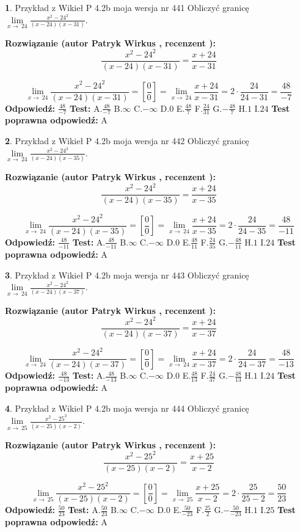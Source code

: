 \documentclass[12pt, a4paper]{article}
\theoremstyle{definition} %
\newtheorem{zad}{}
\newcommand{\zadStart}[1]{\begin{zad}#1\newline}
\newcommand{\zadStop}{\end{zad}}
\newcommand{\rozwStart}[2]{\noindent \textbf{Rozwiązanie (autor #1 , recenzent #2): }\newline}
\newcommand{\rozwStop}{\newline}
\newcommand{\odpStart}{\noindent \textbf{Odpowiedź:}\newline}
\newcommand{\odpStop}{\newline}
\newcommand{\testStart}{\noindent \textbf{Test:}\newline}
\newcommand{\testStop}{\newline}
\newcommand{\kluczStart}{\noindent \textbf{Test poprawna odpowiedź:}\newline}
\newcommand{\kluczStop}{\newline}
\begin{document}
\zadStart{Przykład z Wikieł P 4.2b moja wersja nr 441}
Obliczyć granicę $\lim\limits_{x\to\ 24}\frac{x^{2}-24^{2}}{(x-24)(x-31)}$.
\zadStop
\rozwStart{Patryk Wirkus}{}
$$\frac{x^{2}-24^{2}}{(x-24)(x-31)}=\frac{x+24}{x-31}$$

$$\lim\limits_{x\to\ 24}\frac{x^{2}-24^{2}}{(x-24)(x-31)}=[\frac{0}{0}]=\lim\limits_{x\to\ 24}\frac{x+24}{x-31}=2 \cdot \frac{24}{24-31} = \frac{48}{-7}$$
\rozwStop
\odpStart
$\frac{48}{-7}$
\odpStop
\testStart
A.$\frac{48}{-7}$
B.$\infty$
C.$-\infty$
D.$0$
E.$\frac{48}{7}$
F.$\frac{24}{31}$
G.$-\frac{48}{7}$
H.$1$
I.$24$
\testStop
\kluczStart
A
\kluczStop



\zadStart{Przykład z Wikieł P 4.2b moja wersja nr 442}
Obliczyć granicę $\lim\limits_{x\to\ 24}\frac{x^{2}-24^{2}}{(x-24)(x-35)}$.
\zadStop
\rozwStart{Patryk Wirkus}{}
$$\frac{x^{2}-24^{2}}{(x-24)(x-35)}=\frac{x+24}{x-35}$$

$$\lim\limits_{x\to\ 24}\frac{x^{2}-24^{2}}{(x-24)(x-35)}=[\frac{0}{0}]=\lim\limits_{x\to\ 24}\frac{x+24}{x-35}=2 \cdot \frac{24}{24-35} = \frac{48}{-11}$$
\rozwStop
\odpStart
$\frac{48}{-11}$
\odpStop
\testStart
A.$\frac{48}{-11}$
B.$\infty$
C.$-\infty$
D.$0$
E.$\frac{48}{11}$
F.$\frac{24}{35}$
G.$-\frac{48}{11}$
H.$1$
I.$24$
\testStop
\kluczStart
A
\kluczStop



\zadStart{Przykład z Wikieł P 4.2b moja wersja nr 443}
Obliczyć granicę $\lim\limits_{x\to\ 24}\frac{x^{2}-24^{2}}{(x-24)(x-37)}$.
\zadStop
\rozwStart{Patryk Wirkus}{}
$$\frac{x^{2}-24^{2}}{(x-24)(x-37)}=\frac{x+24}{x-37}$$

$$\lim\limits_{x\to\ 24}\frac{x^{2}-24^{2}}{(x-24)(x-37)}=[\frac{0}{0}]=\lim\limits_{x\to\ 24}\frac{x+24}{x-37}=2 \cdot \frac{24}{24-37} = \frac{48}{-13}$$
\rozwStop
\odpStart
$\frac{48}{-13}$
\odpStop
\testStart
A.$\frac{48}{-13}$
B.$\infty$
C.$-\infty$
D.$0$
E.$\frac{48}{13}$
F.$\frac{24}{37}$
G.$-\frac{48}{13}$
H.$1$
I.$24$
\testStop
\kluczStart
A
\kluczStop



\zadStart{Przykład z Wikieł P 4.2b moja wersja nr 444}
Obliczyć granicę $\lim\limits_{x\to\ 25}\frac{x^{2}-25^{2}}{(x-25)(x-2)}$.
\zadStop
\rozwStart{Patryk Wirkus}{}
$$\frac{x^{2}-25^{2}}{(x-25)(x-2)}=\frac{x+25}{x-2}$$

$$\lim\limits_{x\to\ 25}\frac{x^{2}-25^{2}}{(x-25)(x-2)}=[\frac{0}{0}]=\lim\limits_{x\to\ 25}\frac{x+25}{x-2}=2 \cdot \frac{25}{25-2} = \frac{50}{23}$$
\rozwStop
\odpStart
$\frac{50}{23}$
\odpStop
\testStart
A.$\frac{50}{23}$
B.$\infty$
C.$-\infty$
D.$0$
E.$\frac{50}{-23}$
F.$\frac{25}{2}$
G.$-\frac{50}{-23}$
H.$1$
I.$25$
\testStop
\kluczStart
A
\kluczStop
\end{document}
